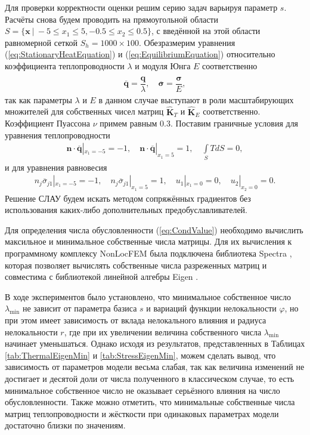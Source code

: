 Для проверки корректности оценки решим серию задач варьируя параметр $s$. Расчёты снова будем проводить на прямоугольной области $S = \{ \boldsymbol{x} \ | \ -5 \leqslant x_1 \leqslant 5, -0.5 \leqslant x_2 \leqslant 0.5  \}$, с введённой на этой области равномерной сеткой $S_h = 1000 \times 100$. Обезразмерим уравнения (\ref{eq:StationaryHeatEquation}) и (\ref{eq:EquilibriumEquation}) относительно коэффициента теплопроводности $\lambda$ и модуля Юнга $E$ соответственно
\begin{gather*}
	\overline{\boldsymbol{q}} = \dfrac{\boldsymbol{q}}{\lambda},
	\quad
	\overline{\boldsymbol{\sigma}} = \dfrac{\widehat{\boldsymbol{\sigma}}}{E},
\end{gather*}
так как параметры $\lambda$ и $E$ в данном случае выступают в роли масштабирующих множителей для собственных чисел матриц $\widehat{\textbf{K}}_T$ и $\widehat{\textbf{K}}_E$ соответственно. Коэффициент Пуассона $\nu$ примем равным 0.3. Поставим граничные условия для уравнения теплопроводности
\begin{gather*}
	\boldsymbol{n} \cdot \overline{\boldsymbol{q}} |_{x_1 = -5} = -1,
	\quad
	\boldsymbol{n} \cdot \overline{\boldsymbol{q}} |_{x_1 = 5} = 1,
	\quad
	\int\limits_S T dS = 0,
\end{gather*}
и для уравнения равновесия
\begin{gather*}
	n_j \overline{\sigma}_{j1} |_{x_1 = -5} = -1,
	\quad
	n_j \overline{\sigma}_{j1} |_{x_1 = 5} = 1,
	\quad
	u_1 |_{x_1 = 0} = 0,
	\quad
	u_2 |_{x_2 = 0} = 0.
\end{gather*}
Решение СЛАУ будем искать методом сопряжённых градиентов без использования каких-либо дополнительных предобуславливателей.

Для определения числа обусловленности (\ref{eq:CondValue}) необходимо вычислить максильное и минимальное собственные числа матрицы. Для их вычисления к программному комплексу NonLocFEM была подключена библиотека Spectra \cite{SpectraLib}, которая позволяет вычислять собственные числа разреженных матриц и совместима с библиотекой линейной алгебры Eigen \cite{EigenLib}.

В ходе экспериментов было установлено, что минимальное собственное число $\lambda_{\min}$ не зависит от параметра базиса $s$ и вариаций функции нелокальности $\varphi$, но при этом имеет зависимость от вклада нелокального влияния и радиуса нелокальности $r$, где при их увеличении величина собственного числа $\lambda_{\min}$ начинает уменьшаться. Однако исходя из результатов, представленных в Таблицах \ref{tab:ThermalEigenMin} и \ref{tab:StressEigenMin}, можем сделать вывод, что зависимость от параметров модели весьма слабая, так как величина изменений не достигает и десятой доли от числа полученного в классическом случае, то есть минимальное собственное число не оказывает серьёзного влияния на число обусловленности. Также можно отметить, что минимальные собственные числа матриц теплопроводности и жёсткости при одинаковых параметрах модели достаточно близки по значениям.

